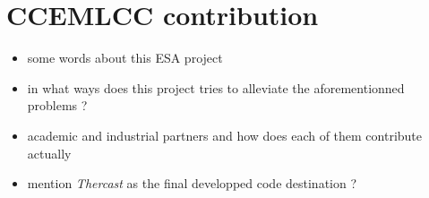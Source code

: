\section*{CCEMLCC contribution}
\begin{itemize}
\item some words about this ESA project
\item in what ways does this project tries to alleviate the aforementionned problems ?
\item academic and industrial partners and how does each of them contribute actually
\item mention \emph{Thercast} as the final developped code destination ?
\end{itemize}


